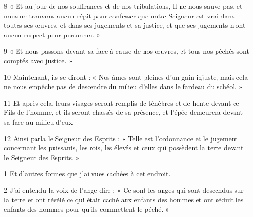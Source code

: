 \par 8 « Et au jour de nos souffrances et de nos tribulations, Il ne nous sauve pas, et nous ne trouvons aucun répit pour confesser que notre Seigneur est vrai dans toutes ses œuvres, et dans ses jugements et sa justice, et que ses jugements n'ont aucun respect pour personnes. »
\par 9 « Et nous passons devant sa face à cause de nos œuvres, et tous nos péchés sont comptés avec justice. »
\par 10 Maintenant, ils se diront : « Nos âmes sont pleines d'un gain injuste, mais cela ne nous empêche pas de descendre du milieu d'elles dans le fardeau du schéol. »
\par 11 Et après cela, leurs visages seront remplis de ténèbres et de honte devant ce Fils de l'homme, et ils seront chassés de sa présence, et l'épée demeurera devant sa face au milieu d'eux.
\par 12 Ainsi parla le Seigneur des Esprits : « Telle est l'ordonnance et le jugement concernant les puissants, les rois, les élevés et ceux qui possèdent la terre devant le Seigneur des Esprits. »


\par 1 Et d'autres formes que j'ai vues cachées à cet endroit.
\par 2 J'ai entendu la voix de l'ange dire : « Ce sont les anges qui sont descendus sur la terre et ont révélé ce qui était caché aux enfants des hommes et ont séduit les enfants des hommes pour qu'ils commettent le péché. »


